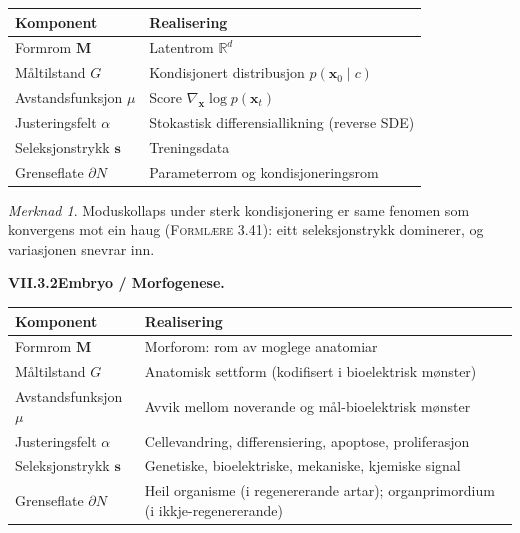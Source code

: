 \documentclass[11pt, a4paper]{article}
\theoremstyle{definition}
\theoremstyle{plain}
\theoremstyle{remark}
\newtheorem*{merknad}{Merknad}
\newcommand{\x}{\mathbf{x}}
\newcommand{\svec}{\mathbf{s}}
\newcommand{\Reals}{\mathbb{R}}
\newcommand{\formlaere}{\textsc{Forml\ae re}}
\begin{document}
\medskip
\begin{center}
\begin{tabular}{@{}l >{\raggedright\arraybackslash}p{8cm}@{}}
\toprule
\textbf{Komponent} & \textbf{Realisering} \\
\midrule
Formrom $\mathbf{M}$         & Latentrom $\Reals^d$ \\
M\aa ltilstand $G$            & Kondisjonert distribusjon $p(\x_0 \mid c)$ \\
Avstandsfunksjon $\mu$        & Score $\nabla_{\x} \log p(\x_t)$ \\
Justeringsfelt $\alpha$       & Stokastisk differensiallikning (reverse SDE) \\
Seleksjonstrykk $\svec$       & Treningsdata \\
Grenseflate $\partial N$      & Parameterrom og kondisjoneringsrom \\
\bottomrule
\end{tabular}
\end{center}

\begin{merknad}
Moduskollaps under sterk kondisjonering er same fenomen som konvergens mot ein haug
(\formlaere{} 3.41): eitt seleksjonstrykk dominerer, og variasjonen snevrar inn.
\end{merknad}

\bigskip
\noindent\textbf{VII.3.2\quad Embryo / Morfogenese.}

\medskip
\begin{center}
\begin{tabular}{@{}l >{\raggedright\arraybackslash}p{8cm}@{}}
\toprule
\textbf{Komponent} & \textbf{Realisering} \\
\midrule
Formrom $\mathbf{M}$         & Morforom: rom av moglege anatomiar \\
M\aa ltilstand $G$            & Anatomisk settform (kodifisert i bioelektrisk m\o nster) \\
Avstandsfunksjon $\mu$        & Avvik mellom noverande og m\aa l-bioelektrisk m\o nster \\
Justeringsfelt $\alpha$       & Cellevandring, differensiering, apoptose, proliferasjon \\
Seleksjonstrykk $\svec$       & Genetiske, bioelektriske, mekaniske, kjemiske signal \\
Grenseflate $\partial N$      & Heil organisme (i regenererande artar); organprimordium (i ikkje-regenererande) \\
\bottomrule
\end{tabular}
\end{center}
\end{document}
